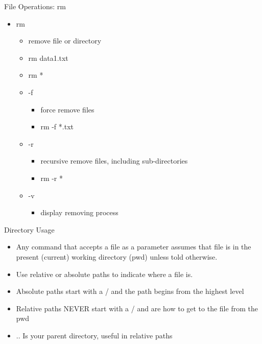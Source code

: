 \documentclass{beamer}
\begin{document}
\begin{frame}{File Operations: rm}
\begin{itemize}
\item rm
\begin{itemize}
\item remove file or directory
\item rm data1.txt
\item rm *
\item -f
\begin{itemize}
\item force remove files
\item rm -f *.txt
\end{itemize}
\item -r
\begin{itemize}
\item recursive remove files, including sub-directories
\item rm -r *
\end{itemize}
\item -v
\begin{itemize}
\item display removing process
\end{itemize}
\end{itemize}
\end{itemize}
\end{frame}

\begin{frame}{Directory Usage}
\begin{itemize}
\item Any command that accepts a file as a parameter assumes that file is in the present (current) working directory (pwd) unless told otherwise.
\item Use relative or absolute paths to indicate where a file is.
\item Absolute paths start with a / and the path begins from the highest level
\item Relative paths NEVER start with a / and are how to get to the file from the pwd
\item .. Is your parent directory, useful in relative paths
\end{itemize}
\end{frame}
\end{document}
